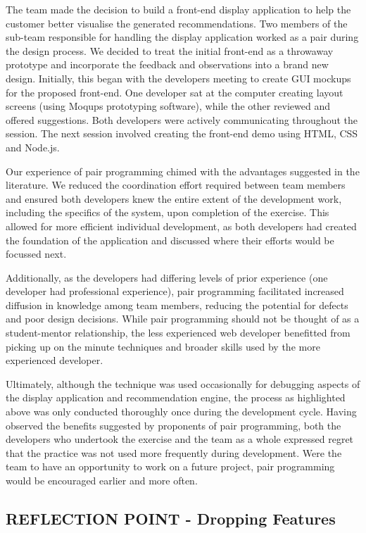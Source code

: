 \documentclass{l3proj}
\begin{document}
The team made the decision to build a front-end display application to help the customer better visualise the generated recommendations. Two members of the sub-team responsible for handling the display application worked as a pair during the design process. We decided to treat the initial front-end as a throwaway prototype and incorporate the feedback and observations into a brand new design. Initially, this began with the developers meeting to create GUI mockups for the proposed front-end. One developer sat at the computer creating layout screens (using Moqups prototyping software), while the other reviewed and offered suggestions. Both developers were actively communicating throughout the session. The next session involved creating the front-end demo using HTML, CSS and Node.js.

Our experience of pair programming chimed with the advantages suggested in the literature. We reduced the coordination effort required between team members and ensured both developers knew the entire extent of the development work, including the specifics of the system, upon completion of the exercise. This allowed for more efficient individual development, as both developers had created the foundation of the application and discussed where their efforts would be focussed next.

Additionally, as the developers had differing levels of prior experience (one developer had professional experience), pair programming facilitated increased diffusion in knowledge among team members, reducing the potential for defects and poor design decisions. While pair programming should not be thought of as a student-mentor relationship, the less experienced web developer benefitted from picking up on the minute techniques and broader skills used by the more experienced developer.

Ultimately, although the technique was used occasionally for debugging aspects of the display application and recommendation engine, the process as highlighted above was only conducted thoroughly once during the development cycle. Having observed the benefits suggested by proponents of pair programming, both the developers who undertook the exercise and the team as a whole expressed regret that the practice was not used more frequently during development. Were the team to have an opportunity to work on a future project, pair programming would be encouraged earlier and more often.

\subsection{REFLECTION POINT - Dropping Features}
\label{sec:droppingreflection}
\end{document}
